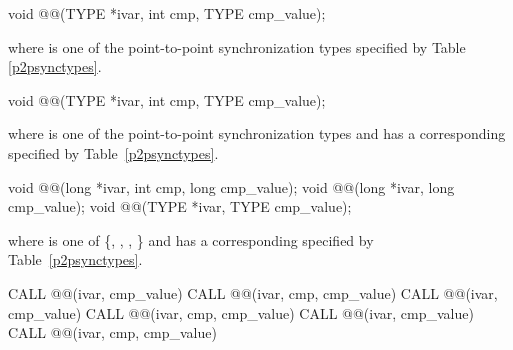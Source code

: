 
\begin{apidefinition}

\begin{C11synopsis}
void @@(TYPE *ivar, int cmp, TYPE cmp_value);
\end{C11synopsis}
where \TYPE{} is one of the point-to-point synchronization types specified by
Table \ref{p2psynctypes}.

\begin{Csynopsis}
void @@(TYPE *ivar, int cmp, TYPE cmp_value);
\end{Csynopsis}
where \TYPE{} is one of the point-to-point synchronization types and has a
corresponding \TYPENAME{} specified by Table~\ref{p2psynctypes}.

\begin{DeprecateBlock}
\begin{CsynopsisCol}
void @@(long *ivar, int cmp, long cmp_value);
void @@(long *ivar, long cmp_value);
void @@(TYPE *ivar, TYPE cmp_value);
\end{CsynopsisCol}
where \TYPE{} is one of \{, , ,
\} and has a corresponding \TYPENAME{} specified by
Table~\ref{p2psynctypes}.
\end{DeprecateBlock}

\begin{Fsynopsis}
CALL @@(ivar, cmp_value)
CALL @@(ivar, cmp, cmp_value)
CALL @@(ivar, cmp_value)
CALL @@(ivar, cmp, cmp_value)
CALL @@(ivar, cmp_value)
CALL @@(ivar, cmp, cmp_value)
\end{Fsynopsis}

\begin{apiarguments}



\end{apiarguments}
\end{apidefinition}
